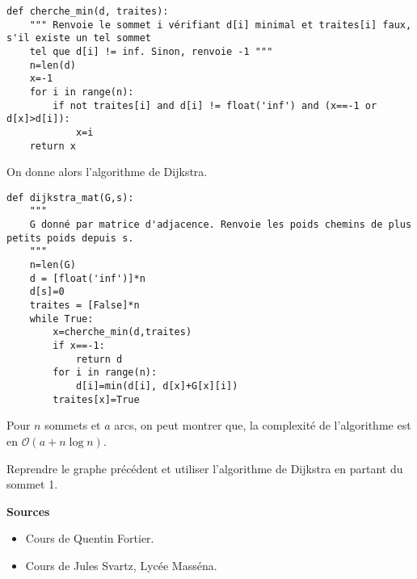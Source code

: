 \begin{lstlisting}
def cherche_min(d, traites):
    """ Renvoie le sommet i vérifiant d[i] minimal et traites[i] faux, s'il existe un tel sommet
    tel que d[i] != inf. Sinon, renvoie -1 """
    n=len(d)
    x=-1
    for i in range(n):
        if not traites[i] and d[i] != float('inf') and (x==-1 or d[x]>d[i]):
            x=i
    return x
\end{lstlisting}


On donne alors l'algorithme de Dijkstra.

\begin{lstlisting}
def dijkstra_mat(G,s):
    """ 
    G donné par matrice d'adjacence. Renvoie les poids chemins de plus petits poids depuis s. 
    """
    n=len(G)
    d = [float('inf')]*n
    d[s]=0
    traites = [False]*n
    while True:
        x=cherche_min(d,traites)
        if x==-1:
            return d
        for i in range(n):
            d[i]=min(d[i], d[x]+G[x][i])
        traites[x]=True
\end{lstlisting}

\begin{prop}
Pour $n$ sommets et $a$ arcs, on peut montrer que, la complexité de l'algorithme est en $\mathcal{O}\left(a+n\log n\right)$.
\end{prop}

\begin{exemple}
Reprendre le graphe précédent et utiliser l'algorithme de Dijkstra en partant du sommet 1.
\end{exemple}

\vfill
\textbf{Sources}
\begin{itemize}
\item Cours de Quentin Fortier.
\item Cours de Jules Svartz, Lycée Masséna.
\end{itemize}
